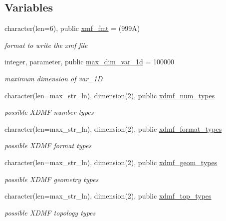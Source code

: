 \subsection*{Variables}
\begin{DoxyCompactItemize}
\item 
character(len=6), public \hyperlink{namespacehdf5__vars_ad8665a0387dde737161d1162565aefa9}{xmf\+\_\+fmt} = \textquotesingle{}(999\+A)\textquotesingle{}
\begin{DoxyCompactList}\small\item\em format to write the xmf file \end{DoxyCompactList}\item 
integer, parameter, public \hyperlink{namespacehdf5__vars_a69c36b36ad7f55ff124ebc328d18adb7}{max\+\_\+dim\+\_\+var\+\_\+1d} = 100000
\begin{DoxyCompactList}\small\item\em maximum dimension of var\+\_\+1D \end{DoxyCompactList}\item 
character(len=max\+\_\+str\+\_\+ln), dimension(2), public \hyperlink{namespacehdf5__vars_ad8c38b66b3e9b402f05e7e7a36415fb3}{xdmf\+\_\+num\+\_\+types}
\begin{DoxyCompactList}\small\item\em possible X\+D\+MF number types \end{DoxyCompactList}\item 
character(len=max\+\_\+str\+\_\+ln), dimension(2), public \hyperlink{namespacehdf5__vars_ab9c0d2270239bf1963c6294ab7198f8c}{xdmf\+\_\+format\+\_\+types}
\begin{DoxyCompactList}\small\item\em possible X\+D\+MF format types \end{DoxyCompactList}\item 
character(len=max\+\_\+str\+\_\+ln), dimension(2), public \hyperlink{namespacehdf5__vars_acabe6ee64c1612c30ab37774678238e5}{xdmf\+\_\+geom\+\_\+types}
\begin{DoxyCompactList}\small\item\em possible X\+D\+MF geometry types \end{DoxyCompactList}\item 
character(len=max\+\_\+str\+\_\+ln), dimension(2), public \hyperlink{namespacehdf5__vars_ad25ea0a5a9a4bb3f9248a7fa61ea1363}{xdmf\+\_\+top\+\_\+types}
\begin{DoxyCompactList}\small\item\em possible X\+D\+MF topology types \end{DoxyCompactList}\item 

\end{DoxyCompactItemize}
